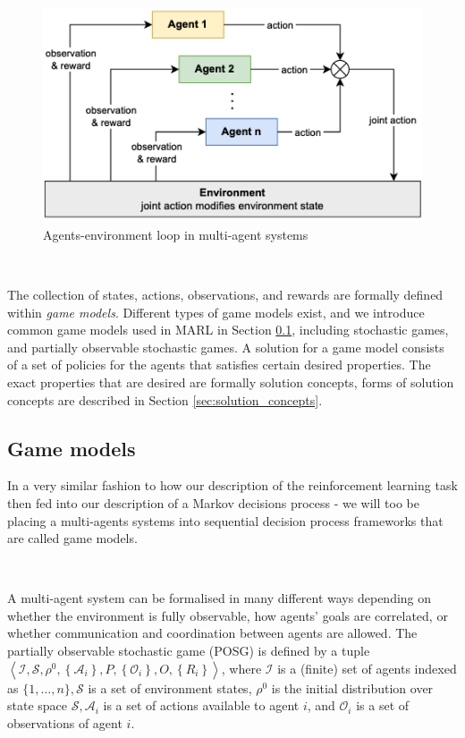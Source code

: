 \documentclass{article}
\begin{document}
\begin{figure}
	\centering
	\includegraphics[scale=0.6]{images/multiple_agent_environment.png}
	\caption{Agents-environment loop \citep{albrecht2024marl} in multi-agent systems}
	\label{fig:agents_environment_loop}
\end{figure}

\

The collection of states, actions, observations, and rewards are formally defined within \textit{game models}. Different types of game models exist, and we introduce common game models used in MARL in Section \ref{sec:game_models}, including  stochastic games, and partially observable stochastic games. A solution for a game model consists of a set of policies for the agents that satisfies certain desired properties. The exact properties that are desired are formally solution concepts, forms of solution concepts are described in Section \ref{sec:solution_concepts}.

\subsection{Game models}\label{sec:game_models}

In a very similar fashion to how our description of the reinforcement learning task then fed into our description of a Markov decisions process - we will too be placing a multi-agents systems into sequential decision process frameworks that are called game models. 

\

A multi-agent system can be formalised in many different ways \citep{oliehoek2016concise} depending on whether the environment is fully observable, how agents' goals are correlated, or whether communication and coordination between agents are allowed. The partially observable stochastic game (POSG) \citep{hansen2004dynamic} is defined by a tuple $\left\langle\mathcal{I}, \mathcal{S}, \rho^0,\left\{\mathcal{A}_i\right\}, P,\left\{\mathcal{O}_i\right\}, O,\left\{R_i\right\}\right\rangle$, where $\mathcal{I}$ is a (finite) set of agents indexed as $\{1, \ldots, n\}, \mathcal{S}$ is a set of environment states, $\rho^0$ is the initial distribution over state space $\mathcal{S}, \mathcal{A}_i$ is a set of actions available to agent $i$, and $\mathcal{O}_i$ is a set of observations of agent $i$. 
\end{document}
